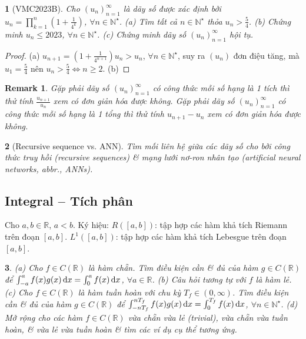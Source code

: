 \documentclass{article}
\newtheorem{baitoan}{}
\newtheorem{remark}{Remark}
\begin{document}
\begin{baitoan}[VMC2023B]
	Cho $(u_n)_{n=1}^\infty$ là dãy số được xác định bởi $u_n = \prod_{k=1}^n \left(1 + \frac{1}{4^k}\right)$, $\forall n\in\mathbb{N}^\star$. (a) Tìm tất cả $n\in\mathbb{N}^\star$ thỏa $u_n > \frac{5}{4}$. (b) Chứng minh $u_n\le2023$, $\forall n\in\mathbb{N}^\star$. (c) Chứng minh dãy số $(u_n)_{n=1}^\infty$ hội tụ.
\end{baitoan}

\begin{proof}
	(a) $u_{n+1} = \left(1 + \frac{1}{4^{n+1}}\right)u_n > u_n$, $\forall n\in\mathbb{N}^\star$, suy ra $(u_n)$ đơn điệu tăng, mà $u_1 = \frac{5}{4}$ nên $u_n > \frac{5}{4}\Leftrightarrow n\ge2$. (b)
\end{proof}

\begin{remark}
	Gặp phải dãy số $(u_n)_{n=1}^\infty$ có công thức mỗi số hạng là 1 tích thì thử tính $\frac{u_{n+1}}{u_n}$ xem có đơn giản hóa được không. Gặp phải dãy số $(u_n)_{n=1}^\infty$ có công thức mỗi số hạng là 1 tổng thì thử tính $u_{n+1} - u_n$ xem có đơn giản hóa được không.
\end{remark}

\begin{baitoan}[Recursive sequence vs. ANN]
	Tìm mối liên hệ giữa các dãy số cho bởi công thức truy hồi (recursive sequences) \& mạng lưới nơ-ron nhân tạo (artificial neural networks, abbr., ANNs).
\end{baitoan}


\subsection{Integral -- Tích phân}
Cho $a,b\in\mathbb{R}$, $a < b$. Ký hiệu: $R([a,b])$: tập hợp các hàm khả tích Riemann trên đoạn $[a,b]$. $L^1([a,b])$: tập hợp các hàm khả tích Lebesgue trên đoạn $[a,b]$.

\begin{baitoan}
	(a) Cho $f\in C(\mathbb{R})$ là hàm chẵn. Tìm điều kiện cần \& đủ của hàm $g\in C(\mathbb{R})$ để $\int_{-a}^a f(x)g(x)\,{\rm d}x = \int_0^a f(x)\,{\rm d}x$, $\forall a\in\mathbb{R}$. (b) Câu hỏi tương tự với $f$ là hàm lẻ. (c) Cho $f\in C(\mathbb{R})$ là hàm tuần hoàn với chu kỳ $T_f\in(0,\infty)$. Tìm điều kiện cần \& đủ của hàm $g\in C(\mathbb{R})$ để  $\int_{-nT_f}^{nT_f} f(x)g(x)\,{\rm d}x = \int_0^{T_f} f(x)\,{\rm d}x$, $\forall n\in\mathbb{N}^\star$. (d) Mở rộng cho các hàm $f\in C(\mathbb{R})$ vừa chẵn vừa lẻ (trivial), vừa chẵn vừa tuần hoàn, \& vừa lẻ vừa tuần hoàn \& tìm các ví dụ cụ thể tương ứng.
\end{baitoan}
\end{document}
